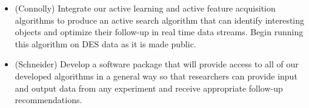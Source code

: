 \documentclass[prd,nofootbib,floatfix,11pt,tightenlines]{revtex4}
\begin{document}

\begin{itemize}

\item (Connolly)
Integrate our active learning and active feature acquisition algorithms to
produce an active search algorithm that can identify interesting objects and optimize
their follow-up in real time data streams.  Begin running this algorithm on DES data
as it is made public.

\item (Schneider) Develop a software package that will provide access to all of our
developed algorithms in a general way so that researchers can provide input and output
data from any experiment and receive appropriate follow-up recommendations.

\end{itemize}

\newpage
\end{document}
